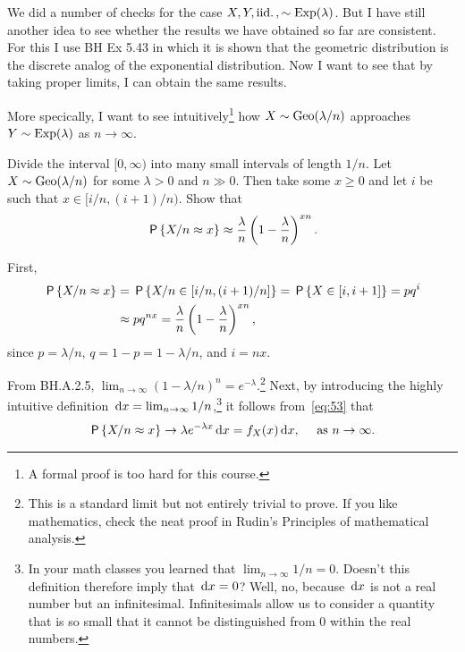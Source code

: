 \documentclass[a4paper,11pt]{article}
\begin{document}
We did a number of checks for the case $X, Y, \iid, \sim\Exp{\lambda}$.
But I have still another idea to see whether the results we have obtained so far are consistent.
For this I use BH Ex 5.43 in which it is shown that the geometric distribution is the discrete analog of the exponential distribution.
Now I want to see that  by taking proper limits, I can  obtain the same results.

More specically, I want to see intuitively\footnote{A formal proof is too hard for this course.} how $X\sim \Geo{\lambda/n}$ approaches  $Y\sim\Exp{\lambda}$ as $n\to\infty$.

\begin{exercise}\label{ex:7}
Divide the interval $[0, \infty)$ into many small intervals of length $1/n$.
Let  $X\sim \Geo{\lambda/n}$ for some $\lambda>0$ and $n\gg 0$. Then take  some $x\geq 0$ and  let $i$ be such that $x\in[i/n, (i+1)/n)$.
Show that
\begin{align}\label{eq:53}
\P{X/n \approx x} \approx \frac{\lambda} n \left(1-\frac \lambda n\right)^{xn}.
\end{align}
\begin{solution}
First,
\begin{align}
\P{X/n \approx x} &= \P{X/n \in [i/n, (i+1)/n]} = \P{X \in [i, i+1]} = p q^{i} \\
&\approx p q^{n x} = \frac{\lambda} n \left(1-\frac \lambda n\right)^{xn},
\end{align}
since $p=\lambda/n$, $q=1-p=1-\lambda/n$, and $i=nx$.
\end{solution}
\end{exercise}
From BH.A.2.5, $\lim_{n\to\infty}(1-\lambda/n)^{n} = e^{-\lambda}$.\footnote{This is a standard limit but not entirely trivial to prove. If you like mathematics, check the neat proof in Rudin's Principles of mathematical analysis.}
Next, by introducing the highly intuitive definition $\d x = \lim_{n\to \infty} 1/n$,\footnote{In your math classes you learned that $\lim_{n\to \infty} 1/n = 0$. Doesn't this definition therefore imply that $\d x = 0$? Well, no, because $\d x$ is not a real number but an infinitesimal. Infinitesimals allow us to consider a quantity that is so small that it cannot be distinguished from 0 within the real numbers.}  it follows from~\cref{eq:53} that
\begin{align}
\P{X/n \approx x} \to \lambda e^{-\lambda x} \d x = f_{X}(x) \d x,\quad\text{ as } n \to \infty.
\end{align}
\end{document}
